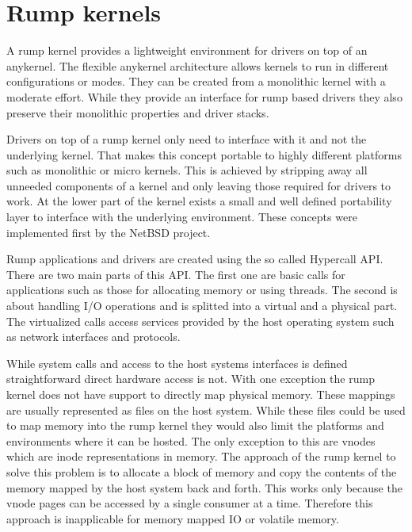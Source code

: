 \documentclass[
a4paper,
12pt,
notitlepage,
parskip=half,
DIV=11,
]{scrbook}
\begin{document}
		\section{Rump kernels}
		A rump kernel provides a lightweight environment for drivers on top of an anykernel.
		The flexible anykernel architecture allows kernels to run in different configurations or modes.
		They can be created from a monolithic kernel with a moderate effort.
		While they provide an interface for rump based drivers they also preserve their monolithic properties and driver stacks. \citep{kantee}
		
		Drivers on top of a rump kernel only need to interface with it and not the underlying kernel.
		That makes this concept portable to highly different platforms such as monolithic or micro kernels.
		This is achieved by stripping away all unneeded components of a kernel and only leaving those required for drivers to work.
		At the lower part of the kernel exists a small and well defined portability layer to interface with the underlying environment.
		These concepts were implemented first by the NetBSD project. \citep{bsd_rump}\citep{fosdem_rump}\citep{rump}
		
		Rump applications and drivers are created using the so called Hypercall API.
		There are two main parts of this API.
		The first one are basic calls for applications such as those for allocating memory or using threads.
		The second is about handling I/O operations and is splitted into a virtual and a physical part.
		The virtualized calls access services provided by the host operating system such as network interfaces and protocols. \citep{rump_man} \citep{rump_platform}
		
		While system calls and access to the host systems interfaces is defined straightforward direct hardware access is not.
		With one exception the rump kernel does not have support to directly map physical memory.
		These mappings are usually represented as files on the host system.
		While these files could be used to map memory into the rump kernel they would also limit the platforms and environments where it can be hosted.
		The only exception to this are vnodes which are inode representations in memory.
		The approach of the rump kernel to solve this problem is to allocate a block of memory and copy the contents of the memory mapped by the host system back and forth.
		This works only because the vnode pages can be accessed by a single consumer at a time.
		Therefore this approach is inapplicable for memory mapped IO or volatile memory. \citep{kantee}
		
\end{document}
